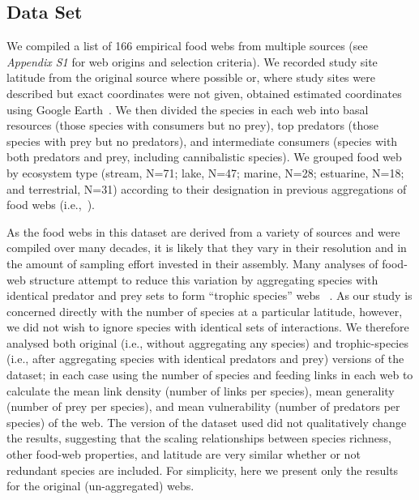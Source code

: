 \documentclass[12pt]{article}
\begin{document}
  \subsection*{Data Set} 

    We compiled a list of 166 empirical food webs from
    multiple sources (see \emph{Appendix S1} for web origins and selection
    criteria). We recorded study site latitude from the original source where
    possible or, where study sites were described but exact coordinates were not
    given, obtained estimated coordinates using Google Earth~\cite{GoogleEarth}.
    We then divided the species in each web into basal resources (those species with
    consumers but no prey), top predators (those species with prey but no predators),
    and intermediate consumers (species with both predators and prey, including cannibalistic
    species). We grouped food web by ecosystem type (stream, N=71; lake, N=47; marine, 
    N=28; estuarine, N=18; and terrestrial, N=31) according to their designation in 
    previous aggregations of food webs (i.e.,~\cite{GlobalWeb,Riede2011,Dunne2013}).


    As the food webs in this dataset are derived from a variety of sources and were compiled over many decades, it
    is likely that they vary in their resolution and in the amount of sampling effort invested in their assembly.
    Many analyses of food-web structure attempt to reduce this variation by aggregating species with identical predator and prey
    sets to form ``trophic species'' webs ~\cite{Martinez1991,Dunne2004,Vermaat2009,Dunne2013}. As our study
    is concerned directly with the number of species at a particular latitude, however, we did not wish to ignore 
    species with identical sets of interactions. We therefore analysed both original (i.e., without aggregating 
    any species) and trophic-species (i.e., after aggregating species with identical predators and prey) versions
    of the dataset; in each case using the number of species and 
    feeding links in each web to calculate the mean link density (number of links per species), mean generality 
    (number of prey per species), and mean vulnerability (number of predators per species) of the web. 
    The version of the dataset used did not qualitatively change the results, suggesting that
    the scaling relationships between species richness, other food-web properties, and latitude are very 
    similar whether or not redundant species are included. For simplicity, here we present only
    the results for the original (un-aggregated) webs.
\end{document}
